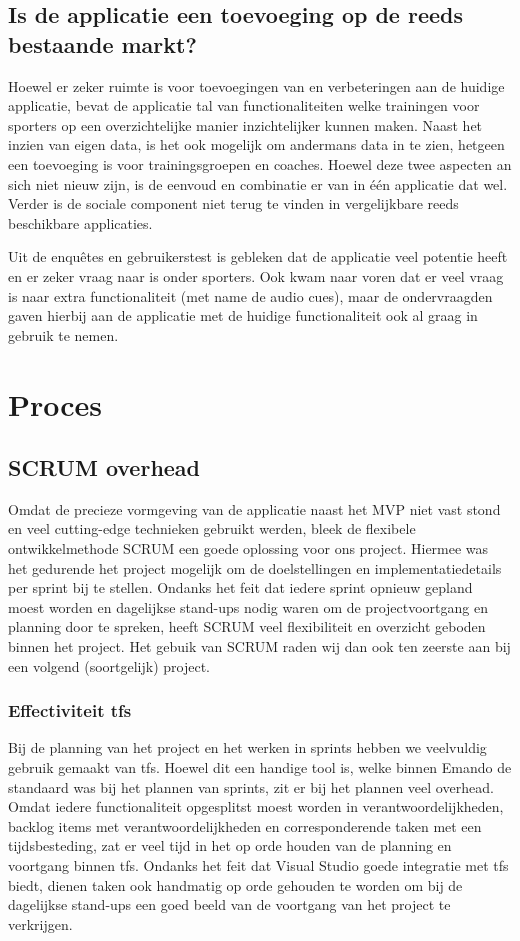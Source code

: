 \subsection{Is de applicatie een toevoeging op de reeds bestaande markt?}
Hoewel er zeker ruimte is voor toevoegingen van en verbeteringen aan de huidige applicatie, bevat de applicatie tal van functionaliteiten welke trainingen voor sporters op een overzichtelijke manier inzichtelijker kunnen maken. Naast het inzien van eigen data, is het ook mogelijk om andermans data in te zien, hetgeen een toevoeging is voor trainingsgroepen en coaches. 
Hoewel deze twee aspecten an sich niet nieuw zijn, is de eenvoud en combinatie er van in één applicatie dat wel. Verder is de sociale component niet terug te vinden in vergelijkbare reeds beschikbare applicaties.

Uit de enquêtes en gebruikerstest is gebleken dat de applicatie veel potentie heeft en er zeker vraag naar is onder sporters. Ook kwam naar voren dat er veel vraag is naar extra functionaliteit (met name de audio cues), maar de ondervraagden gaven hierbij aan de applicatie met de huidige functionaliteit ook al graag in gebruik te nemen.

\section{Proces}

\subsection{SCRUM overhead}
Omdat de precieze vormgeving van de applicatie naast het MVP niet vast stond en veel cutting-edge technieken gebruikt werden, bleek de flexibele ontwikkelmethode SCRUM een goede oplossing voor ons project. Hiermee was het gedurende het project mogelijk om de doelstellingen en implementatiedetails per sprint bij te stellen. Ondanks het feit dat iedere sprint opnieuw gepland moest worden en dagelijkse stand-ups nodig waren om de projectvoortgang en planning door te spreken, heeft SCRUM veel flexibiliteit en overzicht geboden binnen het project. Het gebuik van SCRUM raden wij dan ook ten zeerste aan bij een volgend (soortgelijk) project.

\subsubsection{Effectiviteit \ac{tfs}}
Bij de planning van het project en het werken in sprints hebben we veelvuldig gebruik gemaakt van \ac{tfs}. Hoewel dit een handige tool is, welke binnen Emando de standaard was bij het plannen van sprints, zit er bij het plannen veel overhead. Omdat iedere functionaliteit opgesplitst moest worden in verantwoordelijkheden, backlog items met verantwoordelijkheden en corresponderende taken met een tijdsbesteding, zat er veel tijd in het op orde houden van de planning en voortgang binnen \ac{tfs}. Ondanks het feit dat Visual Studio goede integratie met \ac{tfs} biedt, dienen taken ook handmatig op orde gehouden te worden om bij de dagelijkse stand-ups een goed beeld van de voortgang van het project te verkrijgen.

